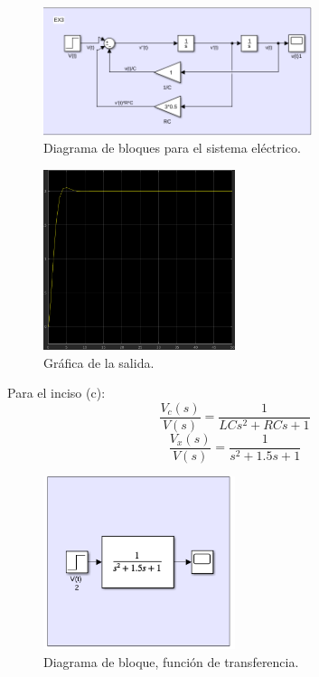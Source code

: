 \documentclass[12pt, letterpaper]{article}
\begin{document}
\begin{enumerate}
		\begin{figure}[H]
			\centering
			\includegraphics[width=0.7\textwidth]{10.png}
			\caption{Diagrama de bloques para el sistema eléctrico.}
		\end{figure}

		\begin{figure}[H]
			\centering
			\includegraphics[width=0.5\textwidth]{11.png}
			\caption{Gráfica de la salida.}
		\end{figure}
		Para el inciso (c):
		\begin{equation}
			\frac{V_c(s)}{V(s)} = \frac{1}{LCs^2 + RCs + 1}
		\end{equation}
		\begin{equation}
			\boxed{\frac{V_x(s)}{V(s)} = \frac{1}{s^2 + 1.5s + 1}}
		\end{equation}

		\begin{figure}[H]
			\centering
			\includegraphics[width=0.5\textwidth]{12.png}
			\caption{Diagrama de bloque, función de transferencia.}
		\end{figure}


\end{enumerate}
\end{document}
